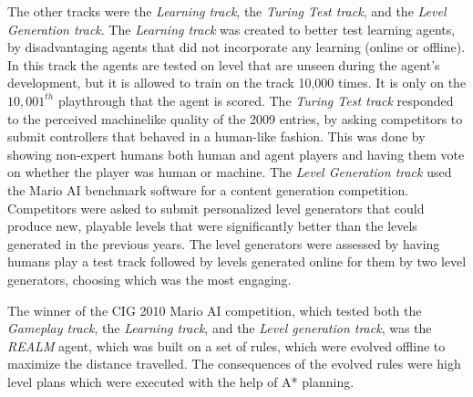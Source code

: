 \documentclass[12pt]{article}
\begin{document}
\begin{multicols}{2}
The other tracks were the \textit {Learning track}, the \textit {Turing Test track}, and the \textit {Level Generation track}. The \textit {Learning track} was created to better test learning agents, by disadvantaging agents that did not incorporate any learning (online or offline). In this track the agents are tested on level that are unseen during the agent's development, but it is allowed to train on the track 10,000 times. It is only on the $10,001^{th}$ playthrough that the agent is scored. The \textit {Turing Test track} responded to the perceived machinelike quality of the 2009 entries, by asking competitors to submit controllers that behaved in a human-like fashion. This was done by showing non-expert humans both human and agent players and having them vote on whether the player was human or machine. The \textit {Level Generation track} used the Mario AI benchmark software for a content generation competition. Competitors were asked to submit personalized level generators that could produce new, playable levels that were significantly better than the levels generated in the previous years. The level generators were assessed by having humans play a test track followed by levels generated online for them by two level generators, choosing which was the most engaging.

The winner of the CIG 2010 Mario AI competition, which tested both the \textit {Gameplay track}, the \textit {Learning track}, and the \textit {Level generation track}, was the \textit{REALM} agent, which was built on a set of rules, which were evolved offline to maximize the distance travelled. The consequences of the evolved rules were high level plans which were executed with the help of A* planning.


\end{multicols}
\end{document}
